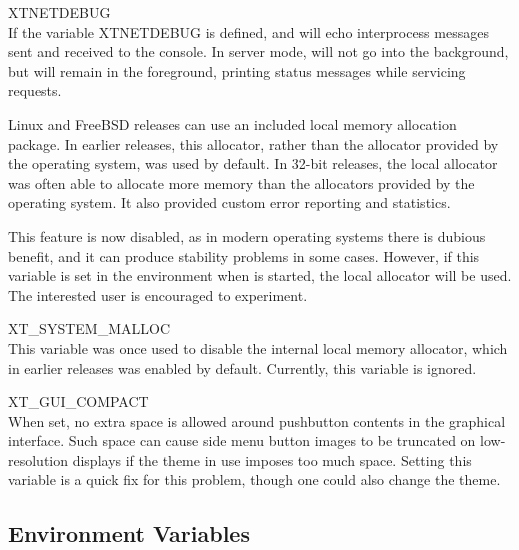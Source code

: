 \begin{description}
\item{\et XTNETDEBUG}\\
If the variable {\et XTNETDEBUG} is defined, {\Xic} and {\WRspice}
will echo interprocess messages sent and received to the console.  In
server mode, {\Xic} will not go into the background, but will remain
in the foreground, printing status messages while servicing requests.

Linux and FreeBSD releases can use an included local memory allocation
package.  In earlier {\Xic} releases, this allocator, rather than the
allocator provided by the operating system, was used by default.  In
32-bit releases, the local allocator was often able to allocate more
memory than the allocators provided by the operating system.  It also
provided custom error reporting and statistics.

This feature is now disabled, as in modern operating systems there is
dubious benefit, and it can produce stability problems in some cases. 
However, if this variable is set in the environment when {\Xic} is
started, the local allocator will be used.  The interested user is
encouraged to experiment.

\item{\et XT\_SYSTEM\_MALLOC}\\
This variable was once used to disable the internal local memory
allocator, which in earlier releases was enabled by default. 
Currently, this variable is ignored.

\item{\et XT\_GUI\_COMPACT}\\
When set, no extra space is allowed around pushbutton contents in the
graphical interface.  Such space can cause side menu button images to
be truncated on low-resolution displays if the theme in use imposes
too much space.  Setting this variable is a quick fix for this
problem, though one could also change the theme.
\end{description}

\subsection{{\Xic} Environment Variables}

